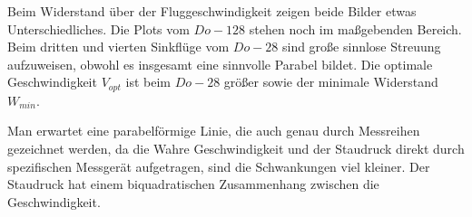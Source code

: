 Beim Widerstand über der Fluggeschwindigkeit zeigen beide Bilder etwas Unterschiedliches. Die Plots vom $Do - 128$ stehen noch im maßgebenden Bereich. Beim dritten und vierten Sinkflüge vom $Do - 28$ sind große sinnlose Streuung aufzuweisen, obwohl es insgesamt eine sinnvolle Parabel bildet. Die optimale Geschwindigkeit $V_{opt}$ ist beim $Do - 28$ größer sowie der minimale Widerstand $W_{min}$.

Man erwartet eine parabelförmige Linie, die auch genau durch Messreihen gezeichnet werden, da die Wahre Geschwindigkeit und der Staudruck direkt durch spezifischen Messgerät aufgetragen, sind die Schwankungen viel kleiner. Der Staudruck hat einem biquadratischen Zusammenhang zwischen die Geschwindigkeit.
\newpage